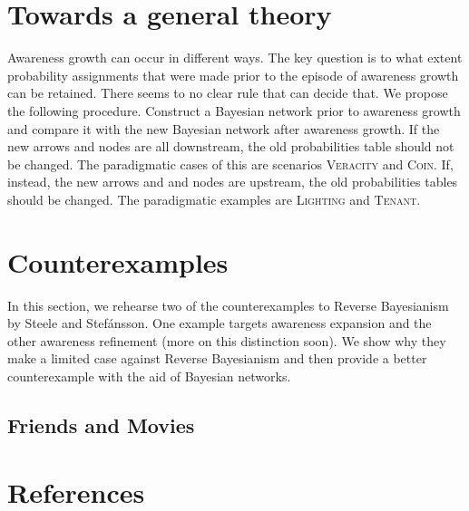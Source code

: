 \documentclass[
  11pt,
  dvipsnames,enabledeprecatedfontcommands]{scrartcl}
\begin{document}
\hypertarget{towards-a-general-theory}{%
\section{Towards a general theory}\label{towards-a-general-theory}}

Awareness growth can occur in different ways. The key question is to
what extent probability assignments that were made prior to the episode
of awareness growth can be retained. There seems to no clear rule that
can decide that. We propose the following procedure. Construct a
Bayesian network prior to awareness growth and compare it with the new
Bayesian network after awareness growth. If the new arrows and nodes are
all downstream, the old probabilities table should not be changed. The
paradigmatic cases of this are scenarios \textsc{Veracity} and
\textsc{Coin}. If, instead, the new arrows and and nodes are upstream,
the old probabilities tables should be changed. The paradigmatic
examples are \textsc{Lighting} and \textsc{Tenant}.

\hypertarget{counterexamples}{%
\section{Counterexamples}\label{counterexamples}}

In this section, we rehearse two of the counterexamples to Reverse
Bayesianism by Steele and Stefánsson. One example targets awareness
expansion and the other awareness refinement (more on this distinction
soon). We show why they make a limited case against Reverse Bayesianism
and then provide a better counterexample with the aid of Bayesian
networks.

\hypertarget{friends-and-movies}{%
\subsection{Friends and Movies}\label{friends-and-movies}}

\label{sec:counterexamples}

\singlespace

\hypertarget{references}{%
\section*{References}\label{references}}
\end{document}
